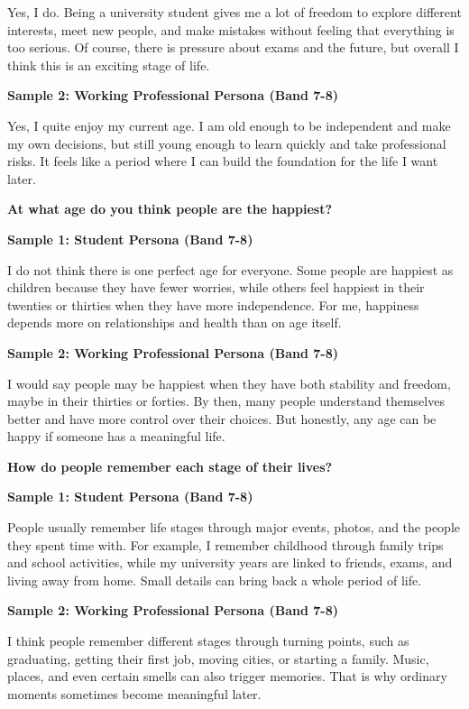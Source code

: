 Yes, I do. Being a university student gives me a lot of freedom to explore different interests, meet new people, and make mistakes without feeling that everything is too serious. Of course, there is pressure about exams and the future, but overall I think this is an exciting stage of life.

\textbf{Sample 2: Working Professional Persona (Band 7-8)}

Yes, I quite enjoy my current age. I am old enough to be independent and make my own decisions, but still young enough to learn quickly and take professional risks. It feels like a period where I can build the foundation for the life I want later.

\separator

\begin{ieltsquestion}
\textbf{At what age do you think people are the happiest?}
\end{ieltsquestion}
\textbf{Sample 1: Student Persona (Band 7-8)}

I do not think there is one perfect age for everyone. Some people are happiest as children because they have fewer worries, while others feel happiest in their twenties or thirties when they have more independence. For me, happiness depends more on relationships and health than on age itself.

\textbf{Sample 2: Working Professional Persona (Band 7-8)}

I would say people may be happiest when they have both stability and freedom, maybe in their thirties or forties. By then, many people understand themselves better and have more control over their choices. But honestly, any age can be happy if someone has a meaningful life.

\separator

\begin{ieltsquestion}
\textbf{How do people remember each stage of their lives?}
\end{ieltsquestion}
\textbf{Sample 1: Student Persona (Band 7-8)}

People usually remember life stages through major events, photos, and the people they spent time with. For example, I remember childhood through family trips and school activities, while my university years are linked to friends, exams, and living away from home. Small details can bring back a whole period of life.

\textbf{Sample 2: Working Professional Persona (Band 7-8)}

I think people remember different stages through turning points, such as graduating, getting their first job, moving cities, or starting a family. Music, places, and even certain smells can also trigger memories. That is why ordinary moments sometimes become meaningful later.

